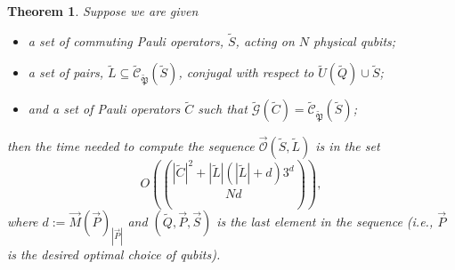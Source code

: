 \documentclass[12pt]{amsbook}
\theoremstyle{plain}
\newtheorem{theorem}{Theorem}
\theoremstyle{definition}
\theoremstyle{remark}
\newcommand{\lst}{\vec}
\newcommand{\set}{\tilde}
\newcommand{\genfun}{\tilde{\mathcal{G}}}
\newcommand{\pauligroup}{{\set{\mathfrak{P}}}}
\newcommand{\centralizer}{\set{\mathcal{C}}}
\newcommand{\optimizer}{\lst{\mathcal{O}}}
\newcommand{\paren}[1]{\left(#1\right)}
\begin{document}
\begin{theorem}
\label{theorem:bound on running time}
Suppose we are given
\begin{itemize}
\item a set of commuting Pauli operators, $\set S$, acting on $N$ physical qubits;
\item a set of pairs, $\set L\subseteq\centralizer_\pauligroup(\set S)$, conjugal with respect to $\set U(\set Q)\cup\set S$;
\item and a set of Pauli operators $\set C$ such that $\genfun(\set C)=\centralizer_\pauligroup(\set S)$;
\end{itemize}
then the time needed to compute the sequence $\optimizer(\set S,\set L)$ is in the set $$O\paren{|\set C|^2+|\set L|(|\set L|+d)3^d\choose{N}{d}},$$ where $d:=\lst M(\lst P)_{|\lst P|}$ and $(\set Q,\lst P,\lst S)$ is the last element in the sequence (i.e., $\lst P$ is the desired optimal choice of qubits).
\end{theorem}
\end{document}
